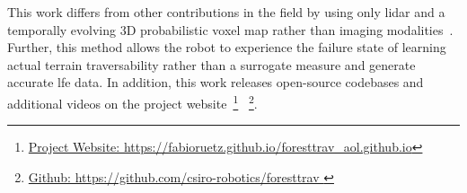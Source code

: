 This work differs from other contributions in the field by using only lidar and a temporally evolving 3D probabilistic voxel map rather than imaging modalities~\cite{frey2023fast, yoon2024adaptive}. Further, this method allows the robot to experience the failure state of learning actual terrain traversability rather than a surrogate measure and generate accurate \ac{lfe} data. In addition, this work releases open-source codebases and additional videos on the project website~\footnote{ \href{https://fabioruetz.github.io/foresttrav_aol.github.io}{Project Website: https://fabioruetz.github.io/foresttrav\_aol.github.io}} ~\footnote{ \href{https://github.com/csiro-robotics/foresttrav}{Github: https://github.com/csiro-robotics/foresttrav }}.

